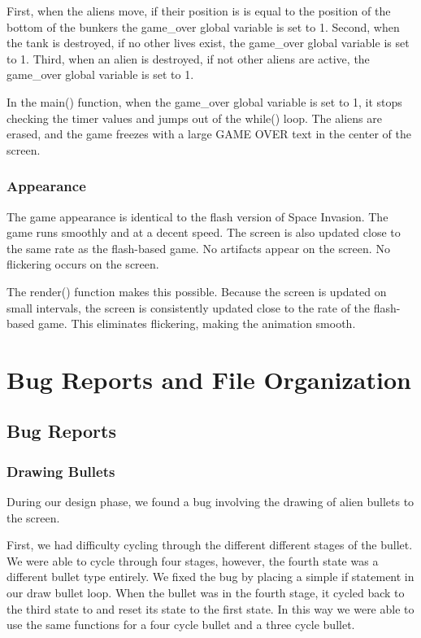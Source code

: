 \documentclass[11pt,letter,oneside]{report}
\begin{document}
First, when the aliens move, if their position is is equal to the position of the bottom of the bunkers the game\_over global variable is set to 1. Second, when the tank is destroyed, if no other lives exist, the game\_over global variable is set to 1. Third, when an alien is destroyed, if not other aliens are active, the game\_over global variable is set to 1.

In the main() function, when the game\_over global variable is set to 1, it stops checking the timer values and jumps out of the while() loop. The aliens are erased, and  the game freezes with a large GAME OVER text in the center of the screen.

\subsection{Appearance}
The game appearance is identical to the flash version of Space Invasion. The game runs smoothly and at a decent speed. The screen is also updated close to the same rate as the flash-based game. No artifacts appear on the screen. No flickering occurs on the screen.

The render() function makes this possible. Because the screen is updated on small intervals, the screen is consistently updated close to the rate of the flash-based game. This eliminates flickering, making the animation smooth.


\chapter{Bug Reports and File Organization}

\section{Bug Reports}

\subsection{Drawing Bullets}
During our design phase, we found a bug involving the drawing of alien bullets to the screen. 

First, we had difficulty cycling through the different different stages of the bullet. We were able to cycle through four stages, however, the fourth state was a different bullet type entirely. We fixed the bug by placing a simple if statement in our draw bullet loop. When the bullet was in the fourth stage, it cycled back to the third state to and reset its state to the first state. In this way we were able to use the same functions for a four cycle bullet and a three cycle bullet.
\end{document}
